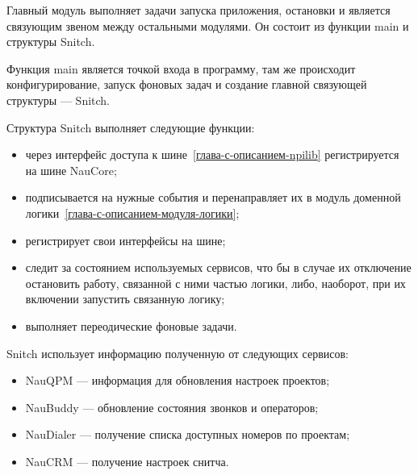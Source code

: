 Главный модуль выполняет задачи запуска приложения, остановки и является связующим звеном между остальными модулями.
Он состоит из функции main и структуры Snitch.

Функция main является точкой входа в программу, там же происходит конфигурирование, запуск фоновых задач
и создание главной связующей структуры --- Snitch.

Структура Snitch выполняет следующие функции:
\begin{itemize}
    \item через интерфейс доступа к шине~\ref{глава-с-описанием-npilib}
    регистрируется на шине NauCore;
    \item подписывается на нужные события %
    и перенаправляет их в модуль доменной логики~\ref{глава-с-описанием-модуля-логики};
    \item регистрирует свои интерфейсы %
    на шине;
    \item следит за состоянием используемых сервисов, что бы в случае их отключение остановить работу, связанной с ними частью логики,
    либо, наоборот, при их включении запустить связанную логику;
    \item выполняет переодические фоновые задачи.
\end{itemize}

Snitch использует информацию полученную от следующих сервисов:
\begin{itemize}
    \item NauQPM --- информация для обновления настроек проектов;
    \item NauBuddy --- обновление состояния звонков и операторов;
    \item NauDialer --- получение списка доступных номеров по проектам;
    \item NauCRM --- получение настроек снитча.
\end{itemize}

